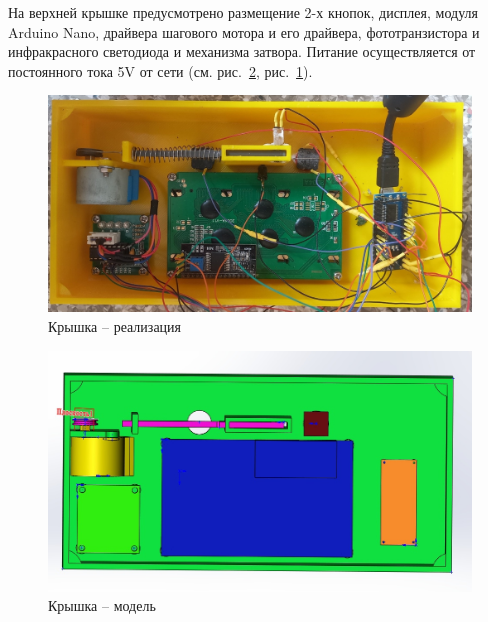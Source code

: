 На верхней крышке предусмотрено размещение 2-х кнопок, дисплея, модуля Arduino Nano, драйвера шагового мотора и его драйвера, фототранзистора и инфракрасного светодиода и механизма затвора. Питание осуществляется от постоянного тока 5V от сети (см. рис.~\ref{ris:kryshka_model}, рис.~\ref{ris:kryshka_real}).  

\begin{figure}[H]
	\centering
	\includegraphics[width=12cm]{kryshka_real.jpg}
	\caption{Крышка -- реализация}
	\label{ris:kryshka_real}
\end{figure}
\par\medskip

\begin{figure}[H]
	\centering
	\includegraphics[width=12cm]{kryshka_model.jpg}
	\caption{Крышка -- модель}
	\label{ris:kryshka_model}
\end{figure}
\par\medskip
